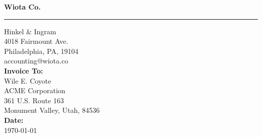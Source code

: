 \documentclass{invoice}
\def \tab {\hspace*{3ex}}
\begin{document}
\hfil{\Huge\bf Wiota Co.}\hfil
\bigskip\break
\hrule
Hinkel \& Ingram \\
4018 Fairmount Ave. \\
Philadelphia, PA, 19104 \\
accounting@wiota.co \\

{\bf Invoice To:} \\
\tab Wile E. Coyote \\
\tab ACME Corporation \\
\tab 361 U.S. Route 163 \\
\tab Monument Valley, Utah, 84536 \\

{\bf Date:} \\
\tab \today \\


\begin{invoiceTable}
\subtotalwithhours
{}
\subtotalnohours
\end{invoiceTable}
\end{document}
